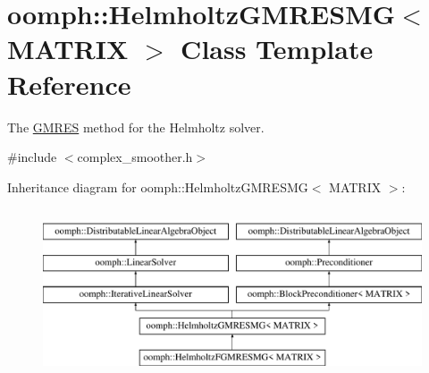 \hypertarget{classoomph_1_1HelmholtzGMRESMG}{}\section{oomph\+:\+:Helmholtz\+G\+M\+R\+E\+S\+MG$<$ M\+A\+T\+R\+IX $>$ Class Template Reference}
\label{classoomph_1_1HelmholtzGMRESMG}


The \hyperlink{classoomph_1_1GMRES}{G\+M\+R\+ES} method for the Helmholtz solver.  




{\ttfamily \#include $<$complex\+\_\+smoother.\+h$>$}

Inheritance diagram for oomph\+:\+:Helmholtz\+G\+M\+R\+E\+S\+MG$<$ M\+A\+T\+R\+IX $>$\+:\begin{figure}[H]
\begin{center}
\leavevmode
\includegraphics[height=5.000000cm]{classoomph_1_1HelmholtzGMRESMG}
\end{center}
\end{figure}
